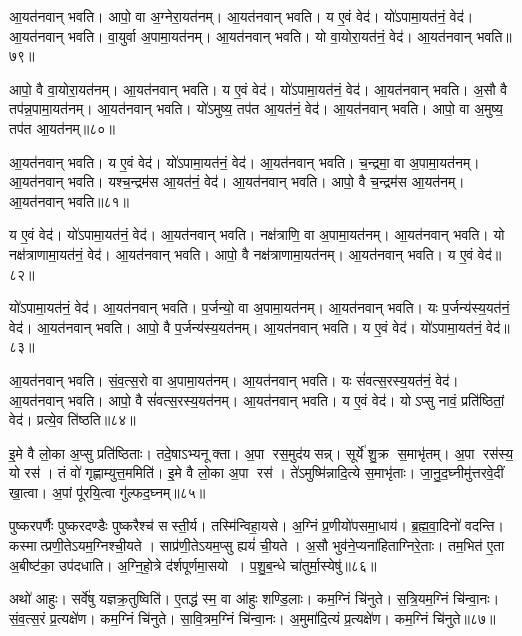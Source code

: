 आ॒यत॑नवान्‌ भवति। आपो॒ वा अ॒ग्नेरा॒यत॑नम्‌। 
आ॒यत॑नवान्‌ भवति। य ए॒वं वेद॑। 
यो॑ऽपामा॒यत॑नं॒ वेद॑। आ॒यत॑नवान्‌ भवति। 
वा॒युर्वा अ॒पामा॒यत॑नम्। आ॒यत॑नवान्‌ भवति। 
यो वा॒योरा॒यत॑नं॒ वेद॑। आ॒यत॑नवान्‌ भवति॥७९॥


आपो॒ वै वा॒योरा॒यत॑नम्। आ॒यत॑नवान्‌ भवति। 
य ए॒वं वेद॑। यो॑ऽपामा॒यत॑नं॒ वेद॑। 
आ॒यत॑नवान्‌ भवति। अ॒सौ वै तप॑न्न॒पामा॒यत॑नम्। 
आ॒यत॑नवान्‌ भवति। यो॑ऽमुष्य॒ तप॑त आ॒यत॑नं॒ वेद॑। 
आ॒यत॑नवान्‌ भवति। आपो॒ वा अ॒मुष्य॒ तप॑त आ॒यत॑नम्॥८०॥


आ॒यत॑नवान्‌ भवति। य ए॒वं वेद॑। 
यो॑ऽपामा॒यत॑नं॒ वेद॑। आ॒यत॑नवान्‌ भवति। 
च॒न्द्रमा॒ वा अ॒पामा॒यत॑नम्‌। आ॒यत॑नवान्‌ भवति। 
यश्च॒न्द्रम॑स आ॒यत॑नं॒ वेद॑। आ॒यत॑नवान्‌ भवति। 
आपो॒ वै च॒न्द्रम॑स आ॒यत॑नम्। आ॒यत॑नवान्‌ भवति॥८१॥


य ए॒वं वेद॑। यो॑ऽपामा॒यत॑नं॒ वेद॑। 
आ॒यत॑नवान्‌ भवति। नक्ष॑त्राणि॒ वा अ॒पामा॒यत॑नम्। 
आ॒यत॑नवान्‌ भवति। यो नक्ष॑त्राणामा॒यत॑नं॒ वेद॑। 
आ॒यत॑नवान्‌ भवति। आपो॒ वै नक्ष॑त्राणामा॒यत॑नम्। 
आ॒यत॑नवान्‌ भवति। य ए॒वं वेद॑॥८२॥


यो॑ऽपामा॒यत॑नं॒ वेद॑। आ॒यत॑नवान्‌ भवति।
प॒र्जन्यो॒ वा अ॒पामा॒यत॑नम्। आ॒यत॑नवान्‌ भवति। 
यः प॒र्जन्य॑स्य॒\aav\aav{}यत॑नं॒ वेद॑। आ॒यत॑नवान्‌ भवति। 
आपो॒ वै प॒र्जन्य॑स्य॒\aav\aav{}यत॑नम्। आ॒यत॑नवान्‌ भवति। 
य ए॒वं वेद॑। यो॑ऽपामा॒यत॑नं॒ वेद॑॥८३॥


आ॒यत॑नवान्‌ भवति। सं॒व॒त्स॒रो वा अ॒पामा॒यत॑नम्। 
आ॒यत॑नवान्‌ भवति। यः सं॑वत्स॒रस्य॒\aav\aav{}यत॑नं॒ वेद॑। 
आ॒यत॑नवान्‌ भवति। आपो॒ वै सं॑वत्स॒रस्य॒\aav\aav{}यत॑नम्‌। 
आ॒यत॑नवान्‌ भवति। य ए॒वं वेद॑। 
योऽप्सु नावं॒ प्रति॑ष्ठितां॒ वेद॑। प्रत्ये॒व ति॑ष्ठति॥८४॥


इ॒मे वै लो॒का अ॒प्सु प्रति॑ष्ठिताः। तदे॒षाऽभ्यनूक्ता। 
अ॒पा रस॒मुद॑यसन्न्‌। सूर्ये॑ शु॒क्र स॒माभृ॑तम्‌। 
अ॒पा रस॑स्य॒ यो रस॑। तं वो॑ गृह्णाम्युत्त॒ममिति॑। 
इ॒मे वै लो॒का अ॒पा रस॑। ते॑ऽमुष्मि॑न्नादि॒त्ये स॒माभृ॑ताः। 
जा॒नु॒द॒घ्नीमु॑त्तर\-वे॒दीं खा॒त्वा। अ॒पां पू॑रयि॒त्वा गु॑ल्फद॒घ्नम्‌॥८५॥


पुष्करपर्णैः पुष्करदण्डैः पुष्करैश्च॑ सस्ती॒र्य। तस्मि॑न्वि\-हा॒यसे। 
अ॒ग्निं प्र॒णीयो॑पसमा॒धाय॑। ब्र॒ह्म॒वा॒दिनो॑ वदन्ति। 
कस्मात्प्रणी॒ते\-ऽयम॒ग्निश्ची॒यते। साप्र॑णी॒तेऽयम॒प्सु ह्ययं॑ ची॒यते। 
अ॒सौ भुव॑ने॒प्यना॑हिताग्निरे॒ताः। तम॒भित॑ ए॒ता अ॒बीष्ट॑का॒ उप॑दधाति। 
अ॒ग्नि॒हो॒त्रे द॑र्शपूर्णमा॒सयो। प॒शु॒ब॒न्धे चा॑तुर्मा॒स्येषु॑॥८६॥


अथो॑ आहुः। सर्वे॑षु यज्ञक्र॒तुष्विति॑। 
ए॒तद्ध॑ स्म॒ वा आ॑हुः शण्डि॒लाः। कम॒ग्निं चि॑नुते। 
स॒त्रि॒यम॒ग्निं चि॑न्वा॒नः। सं॒व॒त्स॒रं प्र॒त्यक्षे॑ण। 
कम॒ग्निं चि॑नुते। सा॒वि॒त्रम॒ग्निं चि॑न्वा॒नः। 
अ॒मुमा॑दि॒त्यं प्र॒त्यक्षे॑ण। कम॒ग्निं चि॑नुते॥८७॥


